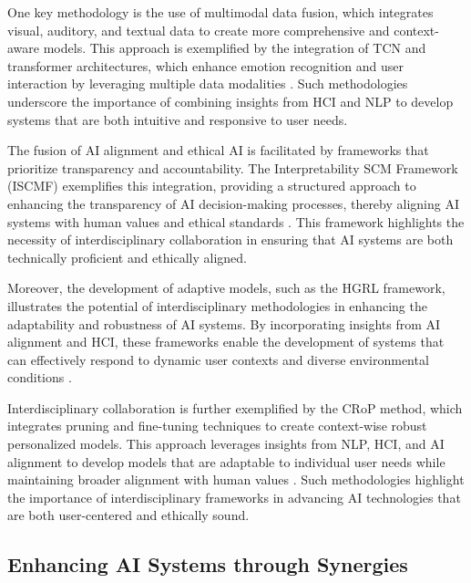 One key methodology is the use of multimodal data fusion, which integrates visual, auditory, and textual data to create more comprehensive and context-aware models. This approach is exemplified by the integration of TCN and transformer architectures, which enhance emotion recognition and user interaction by leveraging multiple data modalities \cite{zhou2023leveragingtcntransformereffective}. Such methodologies underscore the importance of combining insights from HCI and NLP to develop systems that are both intuitive and responsive to user needs.

The fusion of AI alignment and ethical AI is facilitated by frameworks that prioritize transparency and accountability. The Interpretability SCM Framework (ISCMF) exemplifies this integration, providing a structured approach to enhancing the transparency of AI decision-making processes, thereby aligning AI systems with human values and ethical standards \cite{lin2023interpretabilityframeworksimilarcase}. This framework highlights the necessity of interdisciplinary collaboration in ensuring that AI systems are both technically proficient and ethically aligned.

Moreover, the development of adaptive models, such as the HGRL framework, illustrates the potential of interdisciplinary methodologies in enhancing the adaptability and robustness of AI systems. By incorporating insights from AI alignment and HCI, these frameworks enable the development of systems that can effectively respond to dynamic user contexts and diverse environmental conditions \cite{chen2024adaptivenetworkinterventioncomplex}.

Interdisciplinary collaboration is further exemplified by the CRoP method, which integrates pruning and fine-tuning techniques to create context-wise robust personalized models. This approach leverages insights from NLP, HCI, and AI alignment to develop models that are adaptable to individual user needs while maintaining broader alignment with human values \cite{kaur2024cropcontextwiserobuststatic}. Such methodologies highlight the importance of interdisciplinary frameworks in advancing AI technologies that are both user-centered and ethically sound.


\subsection{Enhancing AI Systems through Synergies} \label{subsec:Enhancing AI Systems through Synergies}

